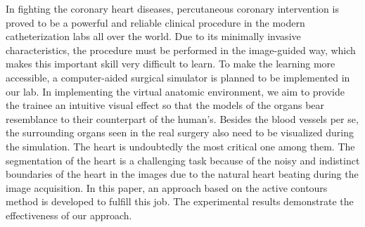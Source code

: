 
In fighting the coronary heart diseases, percutaneous coronary intervention is proved to be a powerful and reliable clinical procedure in the modern catheterization labs all over the world. %
Due to its minimally invasive characteristics, the procedure must be performed in the image-guided way, which makes this important skill very difficult to learn.
To make the learning more accessible, a computer-aided surgical simulator is planned to be implemented in our lab.
In implementing the virtual anatomic environment, we aim to provide the trainee an intuitive visual effect so that the models of the organs bear resemblance to their counterpart of the human's. %
Besides the blood vessels per se, the surrounding organs seen in the real surgery also need to be visualized during the simulation.
The heart is undoubtedly the most critical one among them.
The segmentation of the heart is a challenging task because of the noisy and indistinct boundaries of the heart in the images due to the natural heart beating during the image acquisition. %
In this paper, an approach based on the active contours method is developed to fulfill this job.
The experimental results demonstrate the effectiveness of our approach.